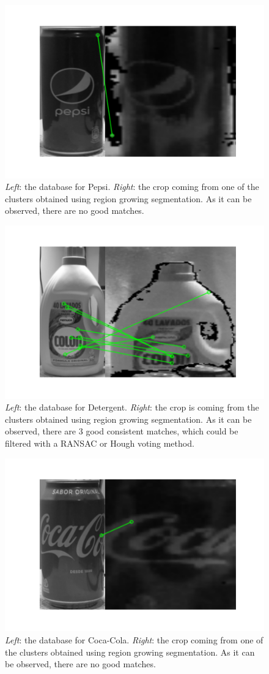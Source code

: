 \documentclass[../main.tex]{subfiles}
\begin{document}
\begin{figure}[H]
    \centering
    \includegraphics[width=0.7\linewidth]{images/sift_pepsi_crop.png}
    \caption{\emph{Left}: the database for Pepsi. \emph{Right}: the crop coming from one of the clusters obtained using region growing segmentation. As it can be observed, there are no good matches.}
    \label{fig:sift_pepsi_crop}
\end{figure}

\begin{figure}[H]
    \centering
    \includegraphics[width=0.7\linewidth]{images/sift_detergent_crop.png}
    \caption{\emph{Left}: the database for Detergent. \emph{Right}: the crop is coming from the clusters obtained using region growing segmentation. As it can be observed, there are 3 good consistent matches, which could be filtered with a RANSAC or Hough voting method.}
    \label{fig:sift_detergent_crop}
\end{figure}

\begin{figure}[H]
    \centering
    \includegraphics[width=0.7\linewidth]{images/sift_cocacola_crop.png}
    \caption{\emph{Left}: the database for Coca-Cola. \emph{Right}: the crop coming from one of the clusters obtained using region growing segmentation. As it can be observed, there are no good matches.}
    \label{fig:sift_cocacola_crop}
\end{figure}
\end{document}

